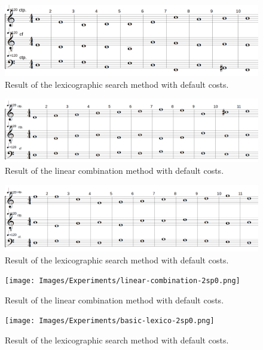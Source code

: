 \begin{figure}[h]
    \centering
    \includegraphics[width=1\textwidth]{Images/Experiments/basic-lexico-1sp0.png}
    \caption{Result of the lexicographic search method with default costs.}
    \label{fig:lexico-1sp0}
\end{figure}



\begin{figure}[h]
    \centering
    \includegraphics[width=1\textwidth]{Images/Experiments/linear-combination-1sp.png}
    \caption{Result of the linear combination method with default costs.}
    \label{fig:combili-1sp}
\end{figure}

\begin{figure}[h]
    \centering
    \includegraphics[width=1\textwidth]{Images/Experiments/basic-lexico-1sp.png}
    \caption{Result of the lexicographic search method with default costs.}
    \label{fig:lexico-1sp}
\end{figure}

\begin{figure}[h]
    \centering
    \texttt{[image: Images/Experiments/linear-combination-2sp0.png]}
    \caption{Result of the linear combination method with default costs.}
    \label{fig:combili-2sp0}
\end{figure}

\begin{figure}[h]
    \centering
    \texttt{[image: Images/Experiments/basic-lexico-2sp0.png]}
    \caption{Result of the lexicographic search method with default costs.}
    \label{fig:lexico-2sp0}
\end{figure}


